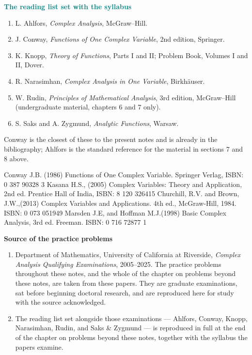 \documentclass[11pt,a4paper]{article}
\theoremstyle{definition}
\begin{document}
\textbf{\textcolor{teal}{The reading list set with the syllabus}}
\begin{enumerate}
\item[1).] L. Ahlfors, \textit{Complex Analysis}, McGraw--Hill.
\item[2).] J. Conway, \textit{Functions of One Complex Variable}, 2nd edition,
Springer.
\item[3).] K. Knopp, \textit{Theory of Functions}, Parts I and II; Problem Book,
Volumes I and II, Dover.
\item[4).] R. Narasimhan, \textit{Complex Analysis in One Variable},
Birkh\"auser.
\item[5).] W. Rudin, \textit{Principles of Mathematical Analysis}, 3rd edition,
McGraw--Hill (undergraduate material, chapters 6 and 7 only).
\item[6).] S. Saks and A. Zygmund, \textit{Analytic Functions}, Warsaw.
\end{enumerate}

Conway is the closest of these to the present notes and is already in the
bibliography; Ahlfors is the standard reference for the material in sections 7
and 8 above.



\pagebreak
\begin{thebibliography}{}
Conway J.B. (1986) Functions of One Complex Variable. Springer Verlag, ISBN: 0 387 90328 3
Kasana H.S., (2005) Complex Variables: Theory and Application, 2nd ed. Prentice Hall of India, ISBN: 8 120 326415
Churchill, R.V. and Brown, J.W.,(2013) Complex Variables and Applications. 4th ed., McGraw-Hill, 1984. ISBN: 0 073 051949
Marsden J.E, and Hoffman M.J.(1998) Basic Complex Analysis, 3rd ed. Freeman. ISBN: 0 716 72877 1
\end{thebibliography}

\textbf{Source of the practice problems}
\begin{enumerate}
\item Department of Mathematics, University of California at Riverside,
\textit{Complex Analysis Qualifying Examinations}, 2005--2025. The practice
problems throughout these notes, and the whole of the chapter on problems beyond
these notes, are taken from these papers. They are graduate examinations, sat
before beginning doctoral research, and are reproduced here for study with the
source acknowledged.
\item The reading list set alongside those examinations --- Ahlfors, Conway, Knopp,
Narasimhan, Rudin, and Saks \& Zygmund --- is reproduced in full at the end of the
chapter on problems beyond these notes, together with the syllabus the papers
examine.
\end{enumerate}
\end{document}
